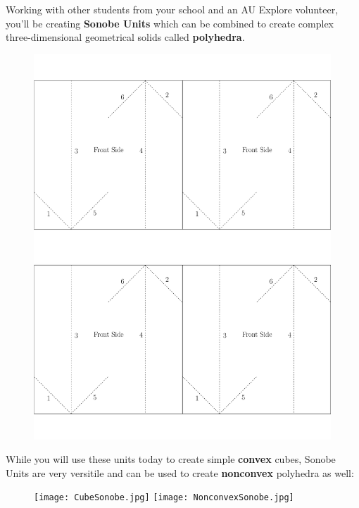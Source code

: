 
\newcommand{\activityname}{
  Know When to Fold 'Em
}
\newcommand{\subtitle}{
  Ge-Origam-itry
}


Working with other students from your school and an AU Explore volunteer, you'll be creating \textbf{Sonobe Units} which can be combined to create complex three-dimensional geometrical solids called \textbf{polyhedra}.

\begin{figure}[h]
\begin{center}
\includegraphics[width=4.4in]{SonobeUnit.pdf}
\end{center}
\end{figure}

While you will use these units today to create simple \textbf{convex} cubes, Sonobe Units are very versitile and can be used to create \textbf{nonconvex} polyhedra as well:

\begin{figure}[h]
\begin{center}
\texttt{[image: CubeSonobe.jpg]}\hspace{0.3in}
\texttt{[image: NonconvexSonobe.jpg]}
\end{center}
\end{figure}

